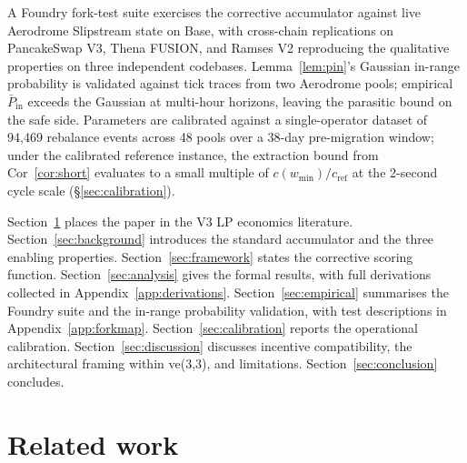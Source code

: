 \documentclass[11pt,a4paper]{article}
\theoremstyle{definition}
\theoremstyle{plain}
\theoremstyle{remark}
\begin{document}
A Foundry fork-test suite exercises the corrective accumulator against live Aerodrome Slipstream state on Base, with cross-chain replications on PancakeSwap V3, Thena FUSION, and Ramses V2 reproducing the qualitative properties on three independent codebases. Lemma~\ref{lem:pin}'s Gaussian in-range probability is validated against tick traces from two Aerodrome pools; empirical $\bar P_{\text{in}}$ exceeds the Gaussian at multi-hour horizons, leaving the parasitic bound on the safe side. Parameters are calibrated against a single-operator dataset of 94{,}469 rebalance events across 48 pools over a 38-day pre-migration window; under the calibrated reference instance, the extraction bound from Cor~\ref{cor:short} evaluates to a small multiple of $c(w_{\min})/c_{\text{ref}}$ at the 2-second cycle scale (\S\ref{sec:calibration}).

Section~\ref{sec:related} places the paper in the V3 LP economics literature. Section~\ref{sec:background} introduces the standard accumulator and the three enabling properties. Section~\ref{sec:framework} states the corrective scoring function. Section~\ref{sec:analysis} gives the formal results, with full derivations collected in Appendix~\ref{app:derivations}. Section~\ref{sec:empirical} summarises the Foundry suite and the in-range probability validation, with test descriptions in Appendix~\ref{app:forkmap}. Section~\ref{sec:calibration} reports the operational calibration. Section~\ref{sec:discussion} discusses incentive compatibility, the architectural framing within ve(3,3), and limitations. Section~\ref{sec:conclusion} concludes.

\section{Related work}\label{sec:related}
\end{document}
